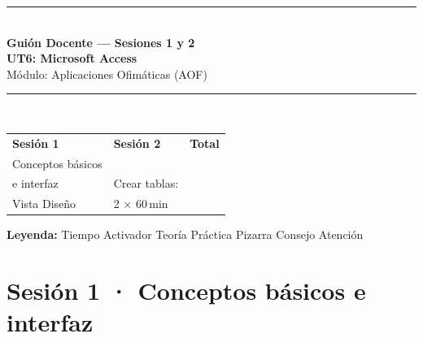 \documentclass[12pt,a4paper]{article}
\begin{document}

\begin{tcolorbox}[
  colback=accessred!5, colframe=accessred,
  boxrule=3pt, arc=4pt, left=12pt, right=12pt, top=10pt, bottom=10pt,
  breakable, enhanced]
\begin{center}
  {\color{accessred}\rule{\linewidth}{2pt}}\\[4pt]
  {\large\bfseries\color{accessred}
    Guión Docente — Sesiones 1 y 2\\[4pt]
    \large UT6: Microsoft Access}\\[6pt]
  {\normalsize\color{darkblue} Módulo: Aplicaciones Ofimáticas (AOF)}\\[4pt]
  {\color{accessred}\rule{\linewidth}{1pt}}\\[8pt]
  \begin{tabular}{>{\centering\arraybackslash}p{4cm}
                  >{\centering\arraybackslash}p{4cm}
                  >{\centering\arraybackslash}p{4cm}}
    \textbf{Sesión 1} & \textbf{Sesión 2} & \textbf{Total} \\[2pt]
    \small Conceptos básicos\\e interfaz &
    \small Crear tablas:\\Vista Diseño &
    \small 2 $\times$ 60\,min \\
  \end{tabular}
\end{center}
\end{tcolorbox}

\bigskip

\begin{tcolorbox}[colback=graylight, colframe=gray!40, sharp corners,
                  left=4pt, right=4pt, top=4pt, bottom=4pt,
                  breakable, enhanced]
\small\textbf{Leyenda:}\quad
\textcolor{timercolor}{} Tiempo\quad
\textcolor{actcolor}{} Activador\quad
\textcolor{theorycolor}{} Teoría\quad
\textcolor{practcolor}{} Práctica\quad
\textcolor{board!60!black}{} Pizarra\quad
\textcolor{tipcolor}{} Consejo\quad
\textcolor{warncolor}{} Atención
\end{tcolorbox}

\newpage

\section{\quad Sesión 1 · Conceptos básicos e interfaz}
\end{document}
